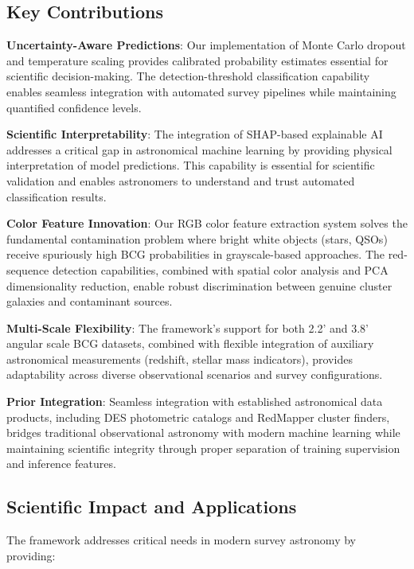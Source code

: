 \documentclass[twocolumn,10pt]{aastex631}
\begin{document}
\subsection{Key Contributions}

\textbf{Uncertainty-Aware Predictions}: Our implementation of Monte Carlo dropout \citep{Gal2016MCDropout} and temperature scaling \citep{Laves2019WellCalibratedMU} provides calibrated probability estimates essential for scientific decision-making. The detection-threshold classification capability enables seamless integration with automated survey pipelines while maintaining quantified confidence levels.

\textbf{Scientific Interpretability}: The integration of SHAP-based explainable AI addresses a critical gap in astronomical machine learning by providing physical interpretation of model predictions. This capability is essential for scientific validation and enables astronomers to understand and trust automated classification results.

\textbf{Color Feature Innovation}: Our RGB color feature extraction system solves the fundamental contamination problem where bright white objects (stars, QSOs) receive spuriously high BCG probabilities in grayscale-based approaches. The red-sequence detection capabilities, combined with spatial color analysis and PCA dimensionality reduction, enable robust discrimination between genuine cluster galaxies and contaminant sources.

\textbf{Multi-Scale Flexibility}: The framework's support for both 2.2' and 3.8' angular scale BCG datasets, combined with flexible integration of auxiliary astronomical measurements (redshift, stellar mass indicators), provides adaptability across diverse observational scenarios and survey configurations.

\textbf{Prior Integration}: Seamless integration with established astronomical data products, including DES photometric catalogs \citep{Rykoff2016DES} and RedMapper cluster finders, bridges traditional observational astronomy with modern machine learning while maintaining scientific integrity through proper separation of training supervision and inference features.

\subsection{Scientific Impact and Applications}

The framework addresses critical needs in modern survey astronomy by providing:
\end{document}
